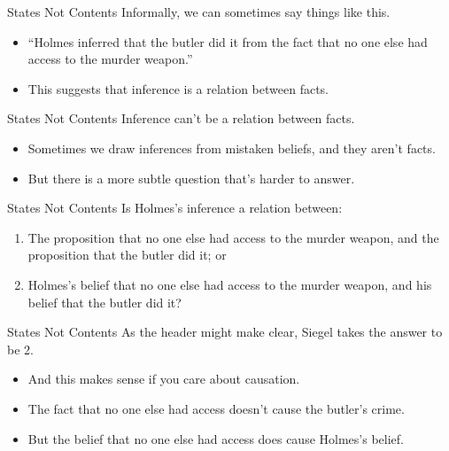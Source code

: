 \documentclass[
  17pt,
  letterpaper,
  ignorenonframetext,
  aspectratio=169,
  xcolor={dvipsnames}]{beamer}
\providecommand{\tightlist}{%
  \setlength{\itemsep}{0pt}\setlength{\parskip}{0pt}}\usepackage{longtable,booktabs,array}
\begin{document}
\begin{frame}{States Not Contents}
\protect\hypertarget{states-not-contents}{}
Informally, we can sometimes say things like this.

\begin{itemize}[<+->]
\tightlist
\item
  ``Holmes inferred that the butler did it from the fact that no one
  else had access to the murder weapon.''
\item
  This suggests that inference is a relation between facts.
\end{itemize}
\end{frame}

\begin{frame}{States Not Contents}
\protect\hypertarget{states-not-contents-1}{}
Inference can't be a relation between facts.

\begin{itemize}[<+->]
\tightlist
\item
  Sometimes we draw inferences from mistaken beliefs, and they aren't
  facts.
\item
  But there is a more subtle question that's harder to answer.
\end{itemize}
\end{frame}

\begin{frame}{States Not Contents}
\protect\hypertarget{states-not-contents-2}{}
Is Holmes's inference a relation between:

\begin{enumerate}[<+->]
\tightlist
\item
  The proposition that no one else had access to the murder weapon, and
  the proposition that the butler did it; or
\item
  Holmes's belief that no one else had access to the murder weapon, and
  his belief that the butler did it?
\end{enumerate}
\end{frame}

\begin{frame}{States Not Contents}
\protect\hypertarget{states-not-contents-3}{}
As the header might make clear, Siegel takes the answer to be 2.

\begin{itemize}[<+->]
\tightlist
\item
  And this makes sense if you care about causation.
\item
  The fact that no one else had access doesn't cause the butler's crime.
\item
  But the belief that no one else had access does cause Holmes's belief.
\end{itemize}
\end{frame}
\end{document}

